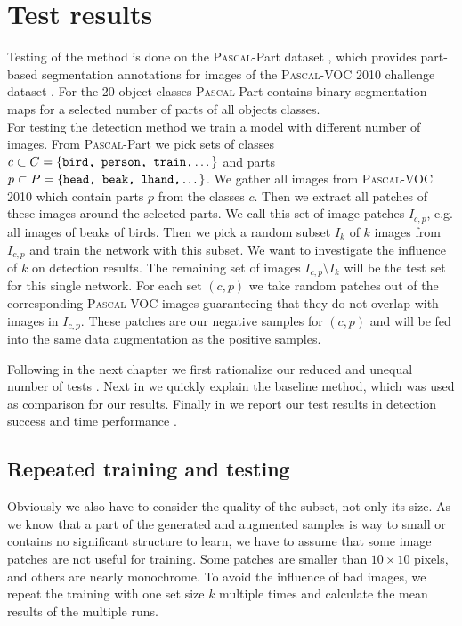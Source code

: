 %
\chapter{Test results}
\label{sec:results}
Testing of the method is done on the \textsc{Pascal}-Part dataset \citep{Chen_2014_CVPR}, which provides part-based segmentation annotations for images of the \textsc{Pascal}-VOC 2010 challenge dataset \citep{pascal-voc-2010}. For the 20 object classes \textsc{Pascal}-Part contains binary segmentation maps for a selected number of parts of all objects classes.\\
For testing the detection method we train a model with different number of images. From \textsc{Pascal}-Part we pick sets of classes $c \subset C = \{\texttt{bird, person, train,}\dotsc\}$ and parts $p \subset P = \{\texttt{head, beak, lhand,}\dotsc\}$. We gather all images from \textsc{Pascal}-VOC 2010 which contain parts $p$ from the classes $c$. Then we extract all patches of these images around the selected parts. We call this set of image patches $I_{c,p}$, e.g. all images of beaks of birds. Then we pick a random subset $I_k$ of $k$ images from $I_{c,p}$ and train the network with this subset. We want to investigate the influence of $k$ on detection results. The remaining set of images $I_{c,p} \setminus I_k$ will be the test set for this single network. For each set $(c,p)$ we take random patches out of the corresponding \textsc{Pascal}-VOC images guaranteeing that they do not overlap with images in $I_{c,p}$. These patches are our negative samples for $(c,p)$ and will be fed into the same data augmentation as the positive samples.

Following in the next chapter we first rationalize our reduced and unequal number of tests . Next in  we quickly explain the baseline method, which was used as comparison for our results. Finally in  we report our test results in detection success and time performance .

\section{Repeated training and testing}
\label{sec:results:repeat}
Obviously we also have to consider the quality of the subset, not only its size. As we know that a part of the generated and augmented samples is way to small or contains no significant structure to learn, we have to assume that some image patches are not useful for training. Some patches are smaller than $10\times10$ pixels, and others are nearly monochrome. To avoid the influence of bad images, we repeat the training with one set size $k$ multiple times and calculate the mean results of the multiple runs.

